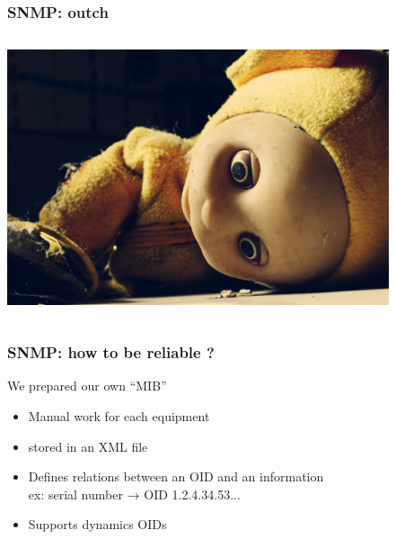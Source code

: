 \documentclass{beamer}
\begin{document}
\begin{frame}
    \frametitle{SNMP: outch}

 \begin{columns}
 \begin{column}{0.35\textwidth}
         \includegraphics[height=7.5cm]{./pics/dead-teletubbies.jpg}
 \end{column}
 \begin{column}{0.65\textwidth}

 \end{column}
\end{columns}
\end{frame}



\begin{frame}
    \frametitle{SNMP: how to be reliable ?}

    \begin{block}{We prepared our own “MIB”}
    \begin{itemize}
    \item Manual work for each equipment
    \item stored in an XML file
    \item Defines relations between an OID and an information \\
        \small{ex: serial number → OID 1.2.4.34.53...}
    \item Supports dynamics OIDs
    \end{itemize}
    \end{block}


\end{frame}
\end{document}
